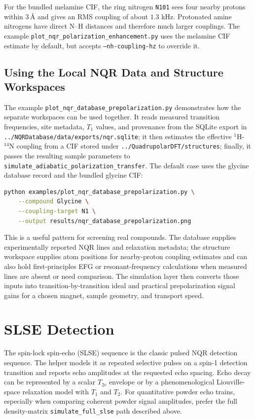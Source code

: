 \documentclass[11pt,oneside]{report}
\newcommand{\code}[1]{\texttt{#1}}
\begin{document}
For the bundled melamine CIF, the ring nitrogen \code{N101} sees four nearby
protons within \(3\,\text{\AA}\) and gives an RMS coupling of about
\(1.3\) kHz. Protonated amine nitrogens have direct N--H distances and
therefore much larger couplings. The example
\code{plot\_nqr\_polarization\_enhancement.py} uses the melamine CIF estimate
by default, but accepts \code{--nh-coupling-hz} to override it.

\subsection{Using the Local NQR Data and Structure Workspaces}

The example \code{plot\_nqr\_database\_prepolarization.py} demonstrates how the
separate workspaces can be used together. It reads measured transition
frequencies, site metadata, \(T_1\) values, and provenance from the SQLite
export in \code{../NQRDatabase/data/exports/nqr.sqlite}; it then estimates the
effective \({}^{1}\mathrm{H}\)-\({}^{14}\mathrm{N}\) coupling from a CIF stored
under \code{../QuadrupolarDFT/structures}; finally, it passes the resulting
sample parameters to
\code{simulate\_adiabatic\_polarization\_transfer}. The default case uses the
glycine database record and the bundled glycine CIF:

\begin{lstlisting}[language=bash]
python examples/plot_nqr_database_prepolarization.py \
    --compound Glycine \
    --coupling-target N1 \
    --output results/nqr_database_prepolarization.png
\end{lstlisting}

This is a useful pattern for screening real compounds. The database supplies
experimentally reported NQR lines and relaxation metadata; the structure
workspace supplies atom positions for nearby-proton coupling estimates and can
also hold first-principles EFG or resonant-frequency calculations when measured
lines are absent or need comparison. The simulation layer then converts those
inputs into transition-by-transition ideal and practical prepolarization signal
gains for a chosen magnet, sample geometry, and transport speed.

\section{SLSE Detection}

The spin-lock spin-echo (SLSE) sequence is the classic pulsed NQR detection
sequence. The helper models it as repeated selective pulses on a spin-1
detection transition and reports echo amplitudes at the requested echo spacing.
Echo decay can be represented by a scalar \(T_{2e}\) envelope or by a
phenomenological Liouville-space relaxation model with \(T_1\) and \(T_2\). For
quantitative powder echo trains, especially when comparing coherent powder
signal amplitudes, prefer the full density-matrix \code{simulate\_full\_slse}
path described above.
\end{document}
